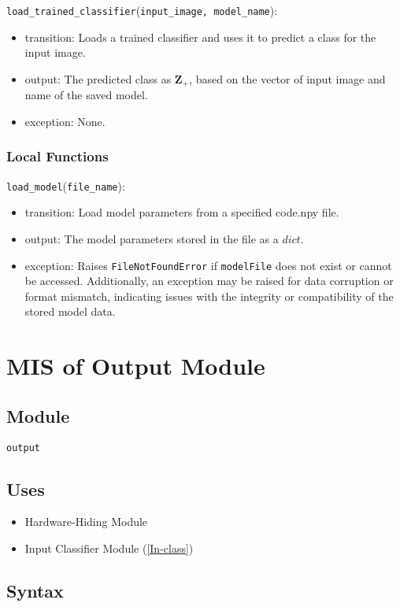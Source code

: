 \documentclass[12pt, titlepage]{article}
\def\code#1{\texttt{#1}}
\begin{document}
\noindent \code{load\_trained\_classifier}(\code{input\_image, model\_name}):
\begin{itemize}
  \item transition: Loads a trained classifier and uses it to predict a class for the input image. 
  \item output: The predicted class as $\mathbf{Z}_{+}$, based on the vector of input image and 
  name of the saved model.
  \item exception: None.
\end{itemize}


\subsubsection{Local Functions}
\noindent \code{load\_model}(\code{file\_name}):
\begin{itemize}
  \item transition: Load model parameters from a specified code{.npy} file.
  \item output: The model parameters stored in the file as a $dict$.
  \item exception: Raises \code{FileNotFoundError} if \code{modelFile} does not exist or cannot be accessed. 
  Additionally, an exception may be raised for data corruption or format mismatch, indicating issues 
  with the integrity or compatibility of the stored model data.
\end{itemize}
\newpage

\section{MIS of Output Module} \label{Output} 

\subsection{Module}
\code{output} 

\subsection{Uses}
\begin{itemize}
  \item Hardware-Hiding Module  
  \item Input Classifier Module (\ref{In-class})
\end{itemize}


\subsection{Syntax}
\end{document}

